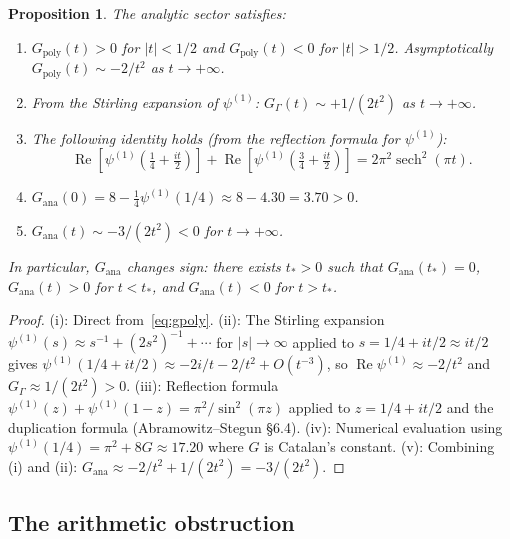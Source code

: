 \documentclass[11pt]{amsart}
\newtheorem{proposition}[theorem]{Proposition}
\renewcommand{\Re}{\operatorname{Re}}
\begin{document}
\begin{proposition}\label{prop:gana}
The analytic sector satisfies:
\begin{enumerate}
  \item[\rm(i)] $G_{\mathrm{poly}}(t) > 0$ for $|t| < 1/2$ and $G_{\mathrm{poly}}(t) < 0$ for $|t| > 1/2$.
    Asymptotically $G_{\mathrm{poly}}(t) \sim -2/t^2$ as $t \to +\infty$.
  \item[\rm(ii)] From the Stirling expansion of $\psi^{(1)}$: $G_\Gamma(t) \sim +1/(2t^2)$ as
    $t \to +\infty$.
  \item[\rm(iii)] The following identity holds (from the reflection formula for $\psi^{(1)}$):
    \[
      \Re\!\left[\psi^{(1)}\!\left(\tfrac{1}{4}+\tfrac{it}{2}\right)\right]
      + \Re\!\left[\psi^{(1)}\!\left(\tfrac{3}{4}+\tfrac{it}{2}\right)\right]
      = 2\pi^2\operatorname{sech}^2(\pi t).
    \]
  \item[\rm(iv)] $G_{\mathrm{ana}}(0) = 8 - \tfrac{1}{4}\psi^{(1)}(1/4) \approx 8 - 4.30 = 3.70 > 0$.
  \item[\rm(v)] $G_{\mathrm{ana}}(t) \sim -3/(2t^2) < 0$ for $t \to +\infty$.
\end{enumerate}
In particular, $G_{\mathrm{ana}}$ changes sign: there exists $t_* > 0$ such that
$G_{\mathrm{ana}}(t_*) = 0$, $G_{\mathrm{ana}}(t) > 0$ for $t < t_*$, and $G_{\mathrm{ana}}(t) < 0$ for $t > t_*$.
\end{proposition}

\begin{proof}
(i): Direct from~\eqref{eq:gpoly}.
(ii): The Stirling expansion $\psi^{(1)}(s) \approx s^{-1} + (2s^2)^{-1} + \cdots$ for $|s| \to \infty$
applied to $s = 1/4+it/2 \approx it/2$ gives
$\psi^{(1)}(1/4+it/2) \approx -2i/t - 2/t^2 + O(t^{-3})$,
so $\Re\psi^{(1)} \approx -2/t^2$ and $G_\Gamma \approx 1/(2t^2) > 0$.
(iii): Reflection formula $\psi^{(1)}(z)+\psi^{(1)}(1-z) = \pi^2/\sin^2(\pi z)$ applied to
$z = 1/4+it/2$ and the duplication formula (Abramowitz--Stegun \cite{AS1964} \S6.4).
(iv): Numerical evaluation using $\psi^{(1)}(1/4) = \pi^2 + 8G \approx 17.20$ where $G$ is
Catalan's constant.
(v): Combining (i) and (ii): $G_{\mathrm{ana}} \approx -2/t^2 + 1/(2t^2) = -3/(2t^2)$.
\end{proof}

\subsection{The arithmetic obstruction}
\end{document}
